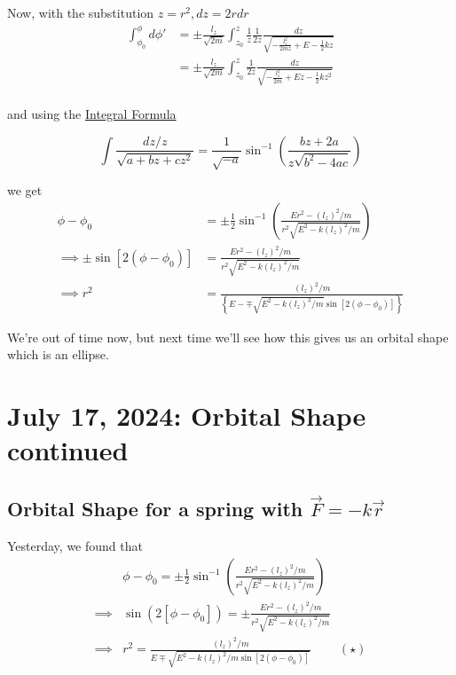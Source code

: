 \documentclass[11pt]{article}
\begin{document}
Now, with the substitution $z = r^2, dz = 2r dr$ 
\begin{align*}
  \int_{\phi_{0}}^{\phi} d\phi' &= \pm \frac{l_z}{\sqrt{2m}} \int_{z_0}^{z} \frac{1}{z} \frac{1}{2z} \frac{dz}{\sqrt{-\frac{l_z^2}{2mz} + E - \frac{1}{2}kz }} \\
  &= \pm \frac{l_z}{\sqrt{2m}} \int_{z_0}^{z} \frac{1}{2z} \frac{dz}{\sqrt{-\frac{l_z^2}{2m} + Ez - \frac{1}{2}kz^2 }} \\
\end{align*}

and using the \underline{Integral Formula}

\[ \int \frac{dz/z}{\sqrt{a + bz + cz^2}} = \frac{1}{\sqrt{-a}} \sin^{-1} \left( \frac{bz + 2a}{z \sqrt{b^2 - 4ac}} \right) \]

we get
\begin{align*}
  \phi - \phi_0 &= \pm \frac{1}{2} \sin^{-1} \left( \frac{Er^2 - (l_z)^2 / m}{r^2 \sqrt{E^2 - k(l_z)^2 / m}} \right) \\
  \implies \pm \sin\left[ 2(\phi - \phi_0) \right] &= \frac{Er^2 - (l_z)^2/m}{r^2 \sqrt{E^2 - k(l_z)^2/m}} \\
  \implies r^2 &= \frac{(l_z)^2 / m}{\left\{ E - \mp \sqrt{E^2 - k(l_z)^2/m} \sin \left[2(\phi - \phi_0)\right] \right\} }
\end{align*}

We're out of time now, but next  time we'll see how this gives us an orbital shape which is an ellipse.


\pagebreak
\section{July 17, 2024: Orbital Shape continued}

\subsection{Orbital Shape for a spring with $\vec{F} = -k\vec{r}$}

Yesterday, we found that 
\begin{align*}
  &\phi - \phi_0 = \pm \frac{1}{2} \sin^{-1}\left(\frac{Er^2 - (l_z)^2/m}{r^2 \sqrt{E^2 - k(l_z)^2/m}}\right) \\
  \implies& \sin(2[\phi - \phi_0]) = \pm  \frac{Er^2 - (l_z)^2/m}{r^2 \sqrt{E^2 - k(l_z)^2/m}} \\
  \implies&\boxed{ r^2 = \frac{(l_z)^2/m}{E \mp \sqrt{E^2 - k(l_z)^2/m \sin\left[2(\phi - \phi_0)\right] }}} \;\;\;\;\;\;\;\;(\star)
\end{align*}
\end{document}
